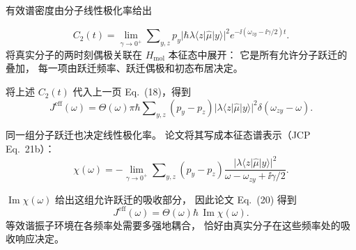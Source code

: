 \begin{frame}{有效谱密度由分子线性极化率给出}

  \scriptsize
  \setlength{\abovedisplayskip}{1pt}
  \setlength{\belowdisplayskip}{1pt}

  \vspace*{0.15em}
  {\fontsize{10}{12}\selectfont
  \[
    C_2(t)
    =\lim_{\gamma\to0^+}\sum\nolimits_{y,z}p_y
      |\hbar\lambda\langle z|\hat\mu|y\rangle|^2
      e^{-\ii(\omega_{zy}-\ii\gamma/2)t}.
  \]}
  将真实分子的两时刻偶极关联在 $H_{\mathrm{mol}}$ 本征态中展开：
  它是所有允许分子跃迁的叠加，
  每一项由跃迁频率、跃迁偶极和初态布居决定。

  \vspace{0.1em}
  将上述 $C_2(t)$ 代入上一页 Eq.~(18)，得到
  {\fontsize{10}{12}\selectfont
  \[
    J^{\mathrm{eff}}(\omega)
    =\Theta(\omega)\pi\hbar\sum\nolimits_{y,z}
      (p_y-p_z)|\lambda\langle z|\hat\mu|y\rangle|^2
      \delta(\omega_{zy}-\omega).
  \]}

  同一组分子跃迁也决定线性极化率。
  论文将其写成本征态谱表示（JCP Eq.~21b）：
  {\fontsize{10}{12}\selectfont
  \[
    \chi(\omega)
    =-\lim_{\gamma\to0^+}\sum\nolimits_{y,z}(p_y-p_z)
      \frac{|\lambda\langle z|\hat\mu|y\rangle|^2}
      {\omega-\omega_{zy}+\ii\gamma/2}.
  \]}

  $\operatorname{Im}\chi(\omega)$ 给出这组允许跃迁的吸收部分，
  因此论文 Eq.~(20) 得到
  {\fontsize{10}{12}\selectfont
  \[
    J^{\mathrm{eff}}(\omega)
    =\Theta(\omega)\hbar\,\operatorname{Im}\chi(\omega).
  \]}
  等效谐振子环境在各频率处需要多强地耦合，
  恰好由真实分子在这些频率处的吸收响应决定。


\end{frame}

